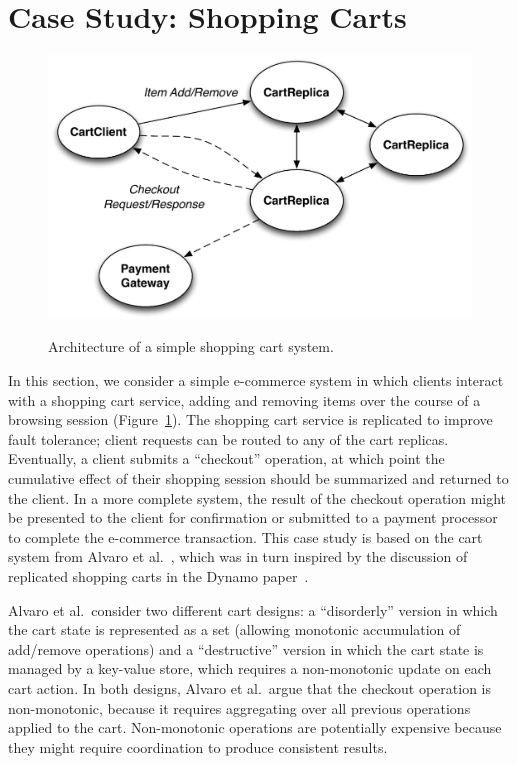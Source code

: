 \section{Case Study: Shopping Carts}
\label{sec:carts}

\begin{figure}[t]
\includegraphics[width=\linewidth]{fig/cart_arch.pdf}
\label{fig:cart-system}
\caption{Architecture of a simple shopping cart system.}
\end{figure}

In this section, we consider a simple e-commerce system in which clients
interact with a shopping cart service, adding and removing items over the course
of a browsing session (Figure~\ref{fig:cart-system}). The shopping cart service
is replicated to improve fault tolerance; client requests can be routed to any
of the cart replicas. Eventually, a client submits a ``checkout'' operation, at
which point the cumulative effect of their shopping session should be summarized
and returned to the client. In a more complete system, the result of the
checkout operation might be presented to the client for confirmation or
submitted to a payment processor to complete the e-commerce transaction. This
case study is based on the cart system from Alvaro et al.~\cite{Alvaro2011},
which was in turn inspired by the discussion of replicated shopping carts in the
Dynamo paper~\cite{DeCandia2007}.

Alvaro et al.\ consider two different cart designs: a ``disorderly'' version in
which the cart state is represented as a set (allowing monotonic accumulation of
add/remove operations) and a ``destructive'' version in which the cart state is
managed by a key-value store, which requires a non-monotonic update on each cart
action. In both designs, Alvaro et al.\ argue that the checkout operation is
non-monotonic, because it requires aggregating over all previous operations
applied to the cart. Non-monotonic operations are potentially expensive because
they might require coordination to produce consistent results.

